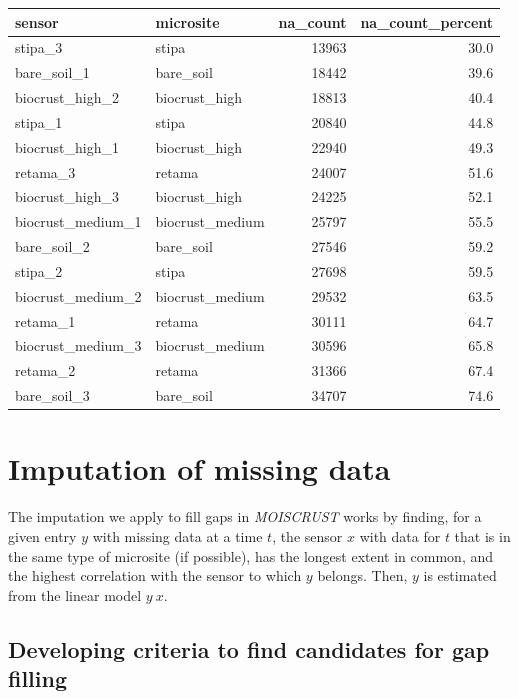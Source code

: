 \documentclass[
  table]{article}
\begin{document}
\begin{table}[H]
\centering
\begin{tabular}[t]{l|l|r|r}
\hline
sensor & microsite & na\_count & na\_count\_percent\\
\hline
stipa\_3 & stipa & 13963 & 30.0\\
\hline
bare\_soil\_1 & bare\_soil & 18442 & 39.6\\
\hline
biocrust\_high\_2 & biocrust\_high & 18813 & 40.4\\
\hline
stipa\_1 & stipa & 20840 & 44.8\\
\hline
biocrust\_high\_1 & biocrust\_high & 22940 & 49.3\\
\hline
retama\_3 & retama & 24007 & 51.6\\
\hline
biocrust\_high\_3 & biocrust\_high & 24225 & 52.1\\
\hline
biocrust\_medium\_1 & biocrust\_medium & 25797 & 55.5\\
\hline
bare\_soil\_2 & bare\_soil & 27546 & 59.2\\
\hline
stipa\_2 & stipa & 27698 & 59.5\\
\hline
biocrust\_medium\_2 & biocrust\_medium & 29532 & 63.5\\
\hline
retama\_1 & retama & 30111 & 64.7\\
\hline
biocrust\_medium\_3 & biocrust\_medium & 30596 & 65.8\\
\hline
retama\_2 & retama & 31366 & 67.4\\
\hline
bare\_soil\_3 & bare\_soil & 34707 & 74.6\\
\hline
\end{tabular}
\end{table}

\hypertarget{imputation-of-missing-data}{%
\section{Imputation of missing data}\label{imputation-of-missing-data}}

The imputation we apply to fill gaps in \emph{MOISCRUST} works by
finding, for a given entry \(y\) with missing data at a time \(t\), the
sensor \(x\) with data for \(t\) that is in the same type of microsite
(if possible), has the longest extent in common, and the highest
correlation with the sensor to which \(y\) belongs. Then, \(y\) is
estimated from the linear model \(y ~ x\).

\hypertarget{developing-criteria-to-find-candidates-for-gap-filling}{%
\subsection{Developing criteria to find candidates for gap
filling}\label{developing-criteria-to-find-candidates-for-gap-filling}}
\end{document}
